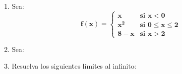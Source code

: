 \documentclass[12pt]{article}
\begin{document}
\begin{enumerate}
            \item Sea: \[
                            \bm{f(x) = \begin{cases}
                                x & \text{si } x < 0 \\
                                x^2 & \text{si } 0 \leq x \leq 2 \\
                                8 - x & \text{si } x > 2
                            \end{cases}}
                        \]
            \item Sea:
            
            
            \item Resuelva los siguientes límites al infinito:
                

        
        \end{enumerate}
\end{document}
